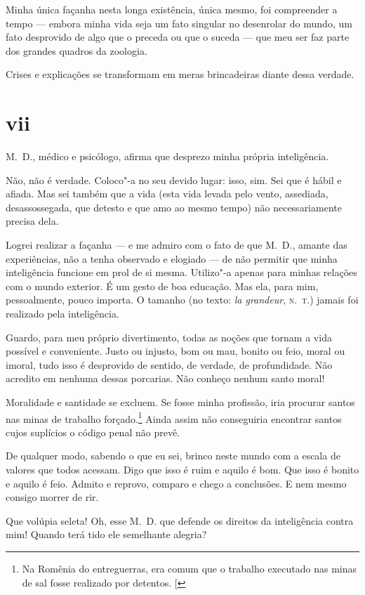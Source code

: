 Minha única façanha nesta longa existência, única mesmo, foi
compreender a tempo --- embora minha vida seja um fato singular no
desenrolar do mundo, um fato desprovido de algo que o preceda ou que o
suceda --- que meu ser faz parte dos grandes quadros da zoologia.

Crises e explicações se transformam em meras brincadeiras diante dessa
verdade.

\section{vii}


M.~D., médico e psicólogo, afirma que desprezo minha própria
inteligência.

Não, não é verdade. Coloco"-a no seu devido lugar: isso, sim. Sei que é
hábil e afiada. Mas sei também que a vida (esta vida levada pelo vento,
assediada, desassossegada, que detesto e que amo ao mesmo
tempo) não necessariamente precisa dela.

Logrei realizar a façanha --- e me admiro com o fato de que M.~D., amante
das experiências, não a tenha observado e elogiado --- de não permitir que
minha inteligência funcione em prol de si mesma. Utilizo"-a apenas para
minhas relações com o mundo exterior. É um gesto de boa educação. Mas
ela, para mim, pessoalmente, pouco importa. O tamanho (no texto: \emph{la
grandeur}, \textsc{n.~t.}) jamais foi realizado pela inteligência.

Guardo, para meu próprio divertimento, todas as noções que tornam a vida
possível e conveniente. Justo ou injusto, bom ou mau, bonito ou feio,
moral ou imoral, tudo isso é desprovido de sentido, de verdade, de
profundidade. Não acredito em nenhuma dessas porcarias. Não
conheço nenhum santo moral!

Moralidade e santidade se excluem. Se fosse minha profissão,
iria procurar santos nas minas de trabalho
forçado.\footnote{Na Romênia do entreguerras, era comum que o trabalho executado nas minas de sal fosse realizado por detentos. {[}\versal{N.~T.}{]}} Ainda
assim não conseguiria encontrar santos cujos suplícios o código
penal não prevê.

De qualquer modo, sabendo o que eu sei, brinco neste mundo com a escala
de valores que todos acessam. Digo que isso é ruim e aquilo é bom. Que
isso é bonito e aquilo é feio. Admito e reprovo, comparo e chego a
conclusões. E nem mesmo consigo morrer de rir.

Que volúpia seleta! Oh, esse M.~D. que defende os direitos da
inteligência contra mim! Quando terá tido ele semelhante alegria?

